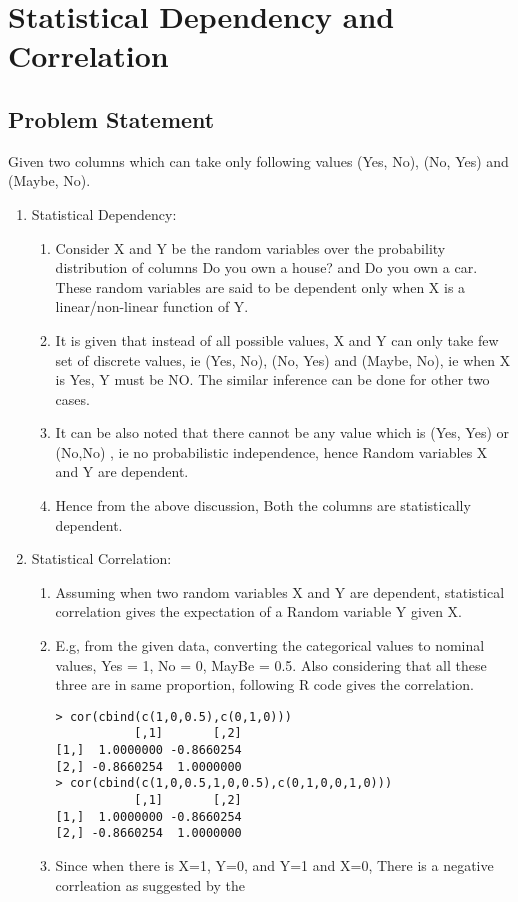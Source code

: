 \documentclass{article}
\begin{document}
\section*{Statistical Dependency and Correlation}
\subsection{Problem Statement}
Given two columns which can take only following values (Yes, No), (No, Yes) and (Maybe, No).\\
\begin{enumerate}
\item Statistical Dependency:
\begin{enumerate}
\item Consider X and Y be the random variables over the probability distribution of columns Do you own a house? and Do you own a car. These random variables are said to be dependent only when X is a linear/non-linear function of Y.
\item It is given that instead of all possible values, X and Y can only take few set of discrete values, ie (Yes, No), (No, Yes) and (Maybe, No), ie when X is Yes, Y must be NO. The similar inference can be done for other two cases.
\item It can be also noted that there cannot be any value which is (Yes, Yes) or (No,No) , ie no probabilistic independence, hence Random variables X and Y are dependent.
\item Hence from the above discussion, Both the columns are statistically dependent.
\end{enumerate}
\item Statistical Correlation:
\begin{enumerate}
\item Assuming when two random variables X and Y are dependent, statistical correlation gives the expectation of a Random variable Y given X.
\item E.g, from the given data, converting the categorical values to nominal values, Yes = 1, No = 0, MayBe = 0.5. Also considering that all these three are in same proportion, following R code gives the correlation.
\begin{verbatim}
> cor(cbind(c(1,0,0.5),c(0,1,0)))
           [,1]       [,2]
[1,]  1.0000000 -0.8660254
[2,] -0.8660254  1.0000000
> cor(cbind(c(1,0,0.5,1,0,0.5),c(0,1,0,0,1,0)))
           [,1]       [,2]
[1,]  1.0000000 -0.8660254
[2,] -0.8660254  1.0000000
\end{verbatim}
\item Since when there is X=1, Y=0, and Y=1 and X=0, There is a negative corrleation as suggested by the 
\end{enumerate}
\end{enumerate}
\end{document}
